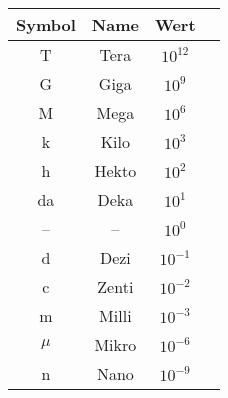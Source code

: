 \documentclass{standalone}
\begin{document}
\begin{tabular}{|c|c|Sc|}\hline
	Symbol  & Name  & Wert        \\ \hline
	T       & Tera  & \(10^{12}\) \\ \hline
	G       & Giga  & \(10^{9}\)  \\ \hline
	M       & Mega  & \(10^{6}\)  \\ \hline
	k       & Kilo  & \(10^{3}\)  \\ \hline
	h       & Hekto & \(10^{2}\)  \\ \hline
	da      & Deka  & \(10^{1}\)  \\ \hline
	--      & --    & \(10^{0}\)  \\ \hline
	d       & Dezi  & \(10^{-1}\) \\ \hline
	c       & Zenti & \(10^{-2}\) \\ \hline
	m       & Milli & \(10^{-3}\) \\ \hline
	\(\mu\) & Mikro & \(10^{-6}\) \\ \hline
	n       & Nano  & \(10^{-9}\) \\ \hline
\end{tabular}
\end{document}
